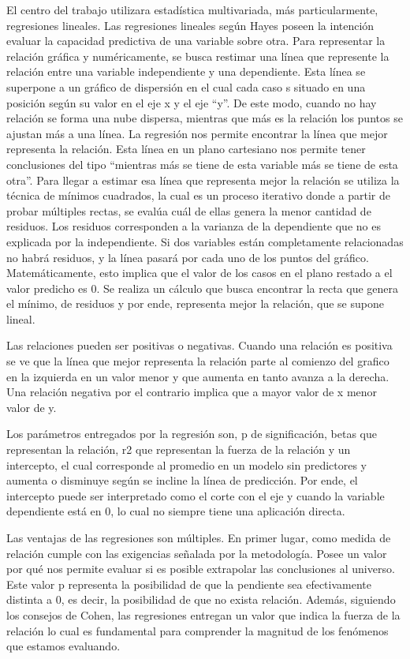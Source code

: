 \documentclass[12pt,twoside]{templates/facsothesis}
\begin{document}
El centro del trabajo utilizara estadística multivariada, más particularmente, regresiones lineales. Las regresiones lineales según Hayes poseen la intención evaluar la capacidad predictiva de una variable sobre otra. Para representar la relación gráfica y numéricamente, se busca restimar una línea que represente la relación entre una variable independiente y una dependiente. Esta línea se superpone a un gráfico de dispersión en el cual cada caso s situado en una posición según su valor en el eje x y el eje ``y''. De este modo, cuando no hay relación se forma una nube dispersa, mientras que más es la relación los puntos se ajustan más a una línea. La regresión nos permite encontrar la línea que mejor representa la relación. Esta línea en un plano cartesiano nos permite tener conclusiones del tipo ``mientras más se tiene de esta variable más se tiene de esta otra''. Para llegar a estimar esa línea que representa mejor la relación se utiliza la técnica de mínimos cuadrados, la cual es un proceso iterativo donde a partir de probar múltiples rectas, se evalúa cuál de ellas genera la menor cantidad de residuos. Los residuos corresponden a la varianza de la dependiente que no es explicada por la independiente. Si dos variables están completamente relacionadas no habrá residuos, y la línea pasará por cada uno de los puntos del gráfico. Matemáticamente, esto implica que el valor de los casos en el plano restado a el valor predicho es 0. Se realiza un cálculo que busca encontrar la recta que genera el mínimo, de residuos y por ende, representa mejor la relación, que se supone lineal.

Las relaciones pueden ser positivas o negativas. Cuando una relación es positiva se ve que la línea que mejor representa la relación parte al comienzo del grafico en la izquierda en un valor menor y que aumenta en tanto avanza a la derecha. Una relación negativa por el contrario implica que a mayor valor de x menor valor de y.

Los parámetros entregados por la regresión son, p de significación, betas que representan la relación, r2 que representan la fuerza de la relación y un intercepto, el cual corresponde al promedio en un modelo sin predictores y aumenta o disminuye según se incline la línea de predicción. Por ende, el intercepto puede ser interpretado como el corte con el eje y cuando la variable dependiente está en 0, lo cual no siempre tiene una aplicación directa.

Las ventajas de las regresiones son múltiples. En primer lugar, como medida de relación cumple con las exigencias señalada por la metodología. Posee un valor por qué nos permite evaluar si es posible extrapolar las conclusiones al universo. Este valor p representa la posibilidad de que la pendiente sea efectivamente distinta a 0, es decir, la posibilidad de que no exista relación. Además, siguiendo los consejos de Cohen, las regresiones entregan un valor que indica la fuerza de la relación lo cual es fundamental para comprender la magnitud de los fenómenos que estamos evaluando.
\end{document}
